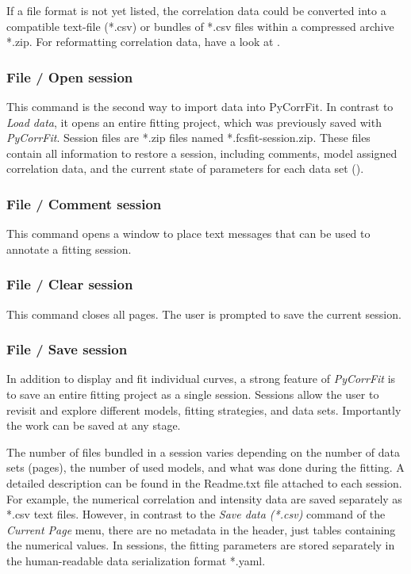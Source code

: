 If a file format is not yet listed, the correlation data could be converted into a compatible text-file (*.csv) or bundles of *.csv files within a compressed archive *.zip. For reformatting correlation data, have a look at .

\subsubsection{File / Open session}
\label{sec:menub.filem.opens}
This command is the second way to import data into PyCorrFit. In contrast to \textit{Load data}, it opens an entire fitting project, which was previously saved with \textit{PyCorrFit}. Session files are *.zip files named *.fcsfit-session.zip. These files contain all information to restore a session, including comments, model assigned correlation data, and the current state of parameters for each data set ().

\subsubsection{File / Comment session}
\label{sec:menub.filem.comme}
This command opens a window to place text messages that can be used to annotate a fitting session.

\subsubsection{File / Clear session}
\label{sec:menub.filem.clear}
This command closes all pages. The user is prompted to save the current session.

\subsubsection{File / Save session}
\label{sec:menub.filem.saves}
In addition to display and fit individual curves, a strong feature of \textit{PyCorrFit} is to save an entire fitting project as a single session. Sessions allow the user to revisit and explore different models, fitting strategies, and data sets. Importantly the work can be saved at any stage.

The number of files bundled in a session varies depending on the number of data sets (pages), the number of used models, and what was done during the fitting. A detailed description can be found in the Readme.txt file attached to each session. For example, the numerical correlation and intensity data are saved separately as *.csv text files. However, in contrast to the \textit{Save data (*.csv)} command of the \textit{Current Page} menu, there are no metadata in the header, just tables containing the numerical values. In sessions, the fitting parameters are stored separately in the human-readable data serialization format *.yaml.

